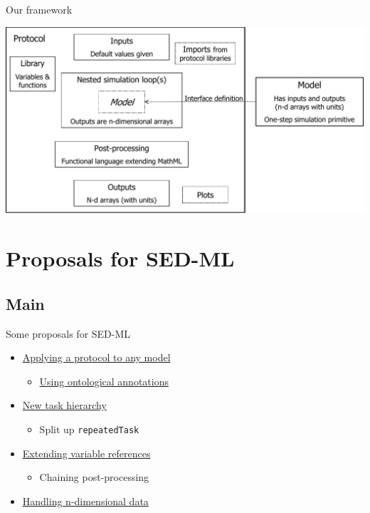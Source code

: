\documentclass[t,xcolor={usenames,dvipsnames}]{beamer}
\newcommand{\sedml}[1]{\lstinline[basicstyle=\color{blue}]!#1!}
\newcommand{\subitem}[1]{\begin{itemize}[<.->]\item #1 \end{itemize}}
\begin{document}
\begin{frame}{Our framework}
\begin{center}
\vspace{-.5cm}\hspace*{-.75cm}\includegraphics[width=1.15\textwidth]{proto_diag}
\end{center}
\end{frame}

\section{Proposals for SED-ML}
\subsection*{Main}

\begin{frame}{Some proposals for SED-ML}
\begin{itemize}
\item \hyperlink{prop:anymodel}{Applying a protocol to any model}
  \subitem{\hyperlink{prop:onto}{Using ontological annotations}}
\item \hyperlink{prop:tasks}{New task hierarchy}
  \subitem{Split up \sedml{repeatedTask}}
\item \hyperlink{prop:varref}{Extending variable references}
  \subitem{Chaining post-processing}
\item \hyperlink{prop:nd}{Handling n-dimensional data}
\end{itemize}
\end{frame}

\end{document}
